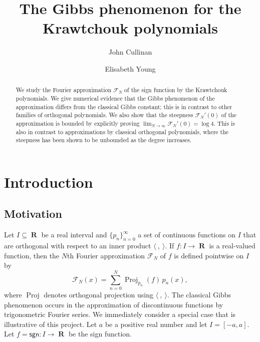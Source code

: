 \documentclass{amsart}
\newcommand{\R}{\operatorname{\mathbf{R}}}
\newcommand{\Proj}{\operatorname{Proj}}
\newcommand{\sgn}{\mathsf{sgn}}
\theoremstyle{plain}
\theoremstyle{remark}
\begin{document}
\title{The Gibbs phenomenon for the Krawtchouk polynomials}

\author{John Cullinan}
\address{Department of Mathematics, Bard College, Annandale-On-Hudson, NY 12504, USA}

\author{Elisabeth Young}
\address{Department of Mathematics, Bard College, Annandale-On-Hudson, NY 12504, USA}

\begin{abstract}
We study the Fourier approximation $\mathcal{F}_N$ of the sign function by the Krawtchouk polynomials.  We give numerical evidence that the Gibbs phenomenon of the approximation differs from the classical Gibbs constant; this is in contrast to other families of orthogonal polynomials.  We also show that the steepness $\mathcal{F}_N'(0)$ of the approximation is bounded by explicitly proving  $\lim_{N \to \infty}  \mathcal{F}_N'(0) = \log 4$.  This is also in contrast to approximations by classical orthogonal polynomials, where the steepness has been shown to be unbounded as the degree increases.  
\end{abstract}


\maketitle

\section{Introduction} \label{introduction}

\subsection{Motivation}

Let $I \subseteq \R$ be a real interval and $\lbrace p_n \rbrace_{n=0}^\infty$ a set of continuous functions on $I$ that are orthogonal with respect to an inner product $\langle~,~\rangle$.  If $f:I \to \R$ is a real-valued function, then the $N$th Fourier approximation $\mathcal{F}_N$ of $f$ is defined pointwise on $I$ by
\[
\mathcal{F}_N(x) = \sum_{n=0}^N \Proj_{p_n}(f)\, p_n(x),
\]
where $\Proj$ denotes orthogonal projection using $\langle ~,~ \rangle$.  The classical Gibbs phenomenon occurs in the approximation of discontinuous functions by trigonometric Fourier series.  We immediately consider a special case that is illustrative of this project.  Let $a$ be a positive real number and let $I = [-a,a]$.  Let $f = \sgn:I \to \R$ be the sign function.
\end{document}
